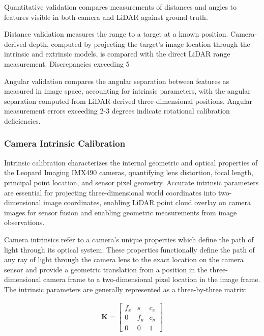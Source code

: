 Quantitative validation compares measurements of distances and angles to features visible in both camera and LiDAR against ground truth.

Distance validation measures the range to a target at a known position.
Camera-derived depth, computed by projecting the target's image location through the intrinsic and extrinsic models, is compared with the direct LiDAR range measurement.
Discrepancies exceeding 5%

Angular validation compares the angular separation between features as measured in image space, accounting for intrinsic parameters, with the angular separation computed from LiDAR-derived three-dimensional positions.
Angular measurement errors exceeding 2-3 degrees indicate rotational calibration deficiencies.

\subsubsection{Camera Intrinsic Calibration} \label{HDR_intrinsic}


Intrinsic calibration characterizes the internal geometric and optical properties of the Leopard Imaging IMX490 cameras, quantifying lens distortion, focal length, principal point location, and sensor pixel geometry.
Accurate intrinsic parameters are essential for projecting three-dimensional world coordinates into two-dimensional image coordinates, enabling LiDAR point cloud overlay on camera images for sensor fusion and enabling geometric measurements from image observations.

Camera intrinsics refer to a camera's unique properties which define the path of light through its optical system.
These properties functionally define the path of any ray of light through the camera lens to the exact location on the camera sensor and provide a geometric translation from a position in the three-dimensional camera frame to a two-dimensional pixel location in the image frame.
The intrinsic parameters are generally represented as a three-by-three matrix:

\begin{equation} \label{eq:K_matrix}
\begin{split}
    \mathbf{K} = \begin{bmatrix} f_x & s & c_x \\ 0 & f_y & c_y \\ 0 & 0 & 1 \end{bmatrix}
    \end{split}
\end{equation}

